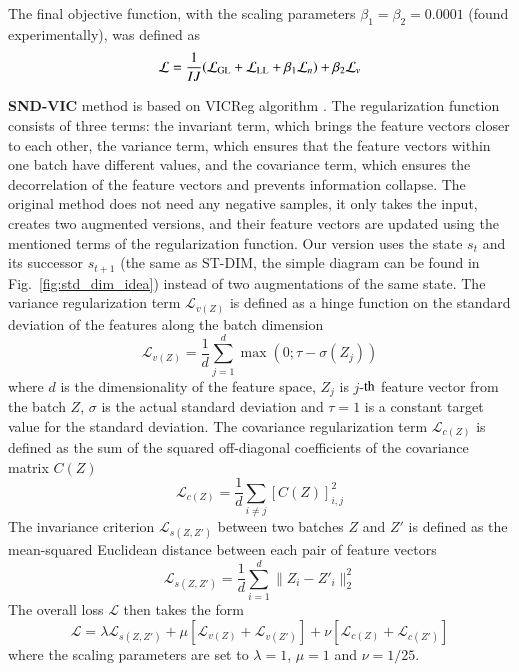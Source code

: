 \documentclass[a4paper,11pt]{elsarticle}
\begin{document}
The final objective function, with the scaling parameters $\beta_{1}=\beta_{2}=0.0001$ (found experimentally), was defined as
\begin{equation}
\label{eq:sndsd6}
\mathcal{L} = \frac{1}{I J} (\mathcal{L}_{\rm GL} + \mathcal{L}_{\rm LL} + \beta_{1} \mathcal{L}_{n}) + \beta_{2} \mathcal{L}_{v}
\end{equation}

\textbf{SND-VIC} method is based on VICReg algorithm \citep{Bardes2022}. The regularization function consists of three terms: the invariant term, which brings the feature vectors closer to each other, the variance term, which ensures that the feature vectors within one batch have different values, and the covariance term, which ensures the decorrelation of the feature vectors and prevents information collapse. The original method does not need any negative samples, it only takes the input, creates two augmented versions, and their feature vectors are updated using the mentioned terms of the regularization function. Our version uses the state $s_t$ and its successor $s_{t+1}$ (the same as ST-DIM, the simple diagram can be found in Fig.~\ref{fig:std_dim_idea}) instead of two augmentations of the same state.
The variance regularization term $\mathcal{L}_{v(Z)}$ is defined as a hinge function on the standard deviation of the features along the batch dimension
\begin{equation}
\label{eq:sndvic1}
\mathcal{L}_{v(Z)} = \frac{1}{d} \sum_{j=1}^{d} \max(0; \tau - \sigma(Z_j)) 
\end{equation}
where $d$ is the dimensionality of the feature space, $Z_{j}$ is $j$-${\rm th}$ feature vector from the batch $Z$, $\sigma$ is the actual standard deviation and $\tau = 1$ is a constant target value for the standard deviation. The covariance regularization term $\mathcal{L}_{c(Z)}$ is defined as the sum of the squared off-diagonal coefficients of the covariance matrix $C(Z)$
\begin{equation}
\label{eq:sndvic2}
\mathcal{L}_{c(Z)} = \frac{1}{d} \sum_{i\neq j} [C(Z)]^{2}_{i,j}
\end{equation}
The invariance criterion $\mathcal{L}_{s(Z,Z')}$ between two batches $Z$ and $Z'$ is defined as the mean-squared Euclidean distance between each pair of feature vectors
\begin{equation}
\label{eq:sndvic3}
\mathcal{L}_{s(Z, Z')} = \frac{1}{d}\sum_{i = 1}^{d}\|Z_i - Z'_i\|^2_{2}
\end{equation}
The overall loss $\mathcal{L}$ then takes the form
\begin{equation}
\label{eq:sndvic4}
\mathcal{L} = \lambda \mathcal{L}_{s(Z, Z')} + \mu \left[\mathcal{L}_{v(Z)} + \mathcal{L}_{v(Z')}\right] + \nu \left[\mathcal{L}_{c(Z)} + \mathcal{L}_{c(Z')}\right]
\end{equation}
where the scaling parameters are set to $\lambda=1$, $\mu=1$ and $\nu=1/25$.
\end{document}
